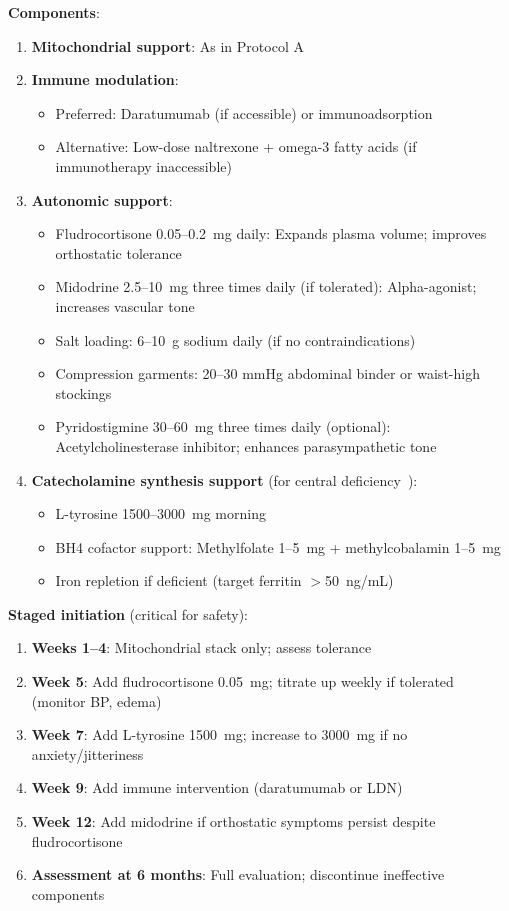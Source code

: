 \textbf{Components}:
\begin{enumerate}
    \item \textbf{Mitochondrial support}: As in Protocol A

    \item \textbf{Immune modulation}:
    \begin{itemize}
        \item Preferred: Daratumumab (if accessible) or immunoadsorption
        \item Alternative: Low-dose naltrexone + omega-3 fatty acids (if immunotherapy inaccessible)
    \end{itemize}

    \item \textbf{Autonomic support}:
    \begin{itemize}
        \item Fludrocortisone 0.05--0.2~mg daily: Expands plasma volume; improves orthostatic tolerance
        \item Midodrine 2.5--10~mg three times daily (if tolerated): Alpha-agonist; increases vascular tone
        \item Salt loading: 6--10~g sodium daily (if no contraindications)
        \item Compression garments: 20--30 mmHg abdominal binder or waist-high stockings
        \item Pyridostigmine 30--60~mg three times daily (optional): Acetylcholinesterase inhibitor; enhances parasympathetic tone
    \end{itemize}

    \item \textbf{Catecholamine synthesis support} (for central deficiency~\cite{walitt2024deep}):
    \begin{itemize}
        \item L-tyrosine 1500--3000~mg morning
        \item BH4 cofactor support: Methylfolate 1--5~mg + methylcobalamin 1--5~mg
        \item Iron repletion if deficient (target ferritin $>$50~ng/mL)
    \end{itemize}
\end{enumerate}

\textbf{Staged initiation} (critical for safety):
\begin{enumerate}
    \item \textbf{Weeks 1--4}: Mitochondrial stack only; assess tolerance
    \item \textbf{Week 5}: Add fludrocortisone 0.05~mg; titrate up weekly if tolerated (monitor BP, edema)
    \item \textbf{Week 7}: Add L-tyrosine 1500~mg; increase to 3000~mg if no anxiety/jitteriness
    \item \textbf{Week 9}: Add immune intervention (daratumumab or LDN)
    \item \textbf{Week 12}: Add midodrine if orthostatic symptoms persist despite fludrocortisone
    \item \textbf{Assessment at 6 months}: Full evaluation; discontinue ineffective components
\end{enumerate}

